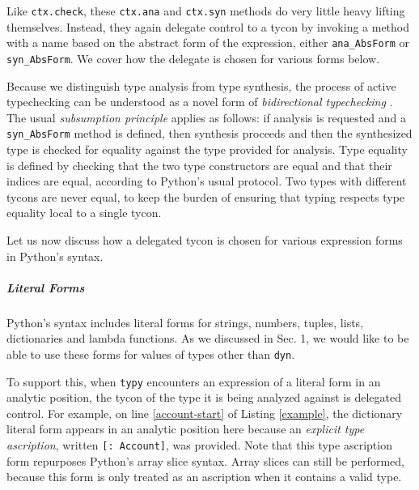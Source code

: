 \documentclass{sigplanconf}
\newcommand{\lip}[1]{\lstinline[language=Python,basicstyle=\ttfamily\small,deletendkeywords={tuple,buffer,map}]{#1}}
\begin{document}
Like \lip{ctx.check}, these \lip{ctx.ana} and \lip{ctx.syn} methods do very little heavy lifting themselves. Instead, they again delegate control to a tycon by invoking a method with a name based on the abstract form of the expression, either \lip{ana_AbsForm} or \lip{syn_AbsForm}. We cover how the delegate is chosen for various forms below.

Because we distinguish type analysis from type synthesis, the process of active typechecking can be understood as a novel form of \emph{bidirectional typechecking} \cite{Pierce:2000:LTI:345099.345100}. The usual \emph{subsumption principle} applies as follows: if analysis is requested and a \lip{syn_AbsForm} method is defined, then synthesis proceeds and then the synthesized type is checked for equality against the type provided for analysis. Type equality is defined by checking that the two type constructors are equal and that their indices are equal, according to Python's usual protocol. Two types with different tycons are never equal, to keep the burden of ensuring that typing respects type equality local to a single tycon.%

Let us now discuss how a delegated tycon is chosen for various expression forms in Python's syntax.

\subparagraph{Literal Forms}
Python's syntax includes literal forms for strings, numbers, tuples, lists, dictionaries and lambda functions. As we discussed in Sec. 1, we would like to be able to use these forms for values of types other than \lip{dyn}.%

To support this, when \lip{typy} encounters an expression of a literal form  in an analytic position, the tycon of the type it is being analyzed against is delegated control. For example, on line \ref{account-start} of Listing \ref{example}, the dictionary literal form appears in an analytic position here because an \emph{explicit type ascription}, written \lip{[: Account]}, was provided. Note that this type ascription form repurposes Python's array slice syntax. Array slices can still be performed, because this form is only treated as an ascription when it contains a valid type. 
\end{document}
